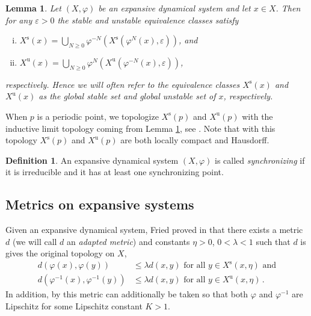 \documentclass{amsart}
\theoremstyle{plain}
\newtheorem{lemma}[theorem]{Lemma}
\theoremstyle{definition}
\newtheorem{definition}[theorem]{Definition}
\theoremstyle{remark}
\begin{document}
\begin{lemma}\label{lem:stable-unstable-inductive-limit-top}
Let $(X,\varphi)$ be an expansive dynamical system and let $x \in X$.  Then for any $\varepsilon > 0$ the stable and unstable equivalence classes satisfy
\begin{enumerate}[(i)]
    \item $\displaystyle X^\text{s}(x) = \bigcup_{N \geq 0} \varphi^{-N}\left(X^\text{s}\left(\varphi^{N}(x), \varepsilon\right)\right)$, and
    \item $\displaystyle X^\text{u}(x) = \bigcup_{N \geq 0} \varphi^{N}\left(X^\text{u}\left(\varphi^{-N}(x), \varepsilon\right)\right)$,
\end{enumerate}
respectively.  Hence we will often refer to the equivalence classes $X^\text{s}(x)$ and $X^\text{u}(x)$ as the \emph{global stable set} and \emph{global unstable set} of $x$, respectively.
\end{lemma}

When $p$ is a periodic point, we topologize $X^\text{s}(p)$ and $X^\text{u}(p)$ with the inductive limit topology coming from Lemma \ref{lem:stable-unstable-inductive-limit-top}, see \cite[Section 4.1]{thomsen2010c}.  Note that with this topology $X^\text{s}(p)$ and $X^\text{u}(p)$ are both locally compact and Hausdorff.

\begin{definition}\label{def:synchronizing-general}
An expansive dynamical system $(X,\varphi)$ is called \emph{synchronizing} if it is irreducible and it has at least one synchronizing point.
\end{definition}


\subsection{Metrics on expansive systems} \label{sec:MetExpSys}
Given an expansive dynamical system, Fried proved in \cite[Lemma 2]{fried1987} that there exists a metric $d$ (we will call $d$ an \emph{adapted metric}) and constants $\eta > 0$, $0 < \lambda < 1$ such that $d$ is gives the original topology on $X$,
\begin{align*}
    d(\varphi(x), \varphi(y)) &\leq \lambda d(x, y) \text{ for all } y \in X^\text{s}(x, \eta) \text{ and} \\
    d(\varphi^{-1}(x), \varphi^{-1}(y)) &\leq \lambda d(x, y) \text{ for all } y \in X^\text{u}(x, \eta) \,.
\end{align*}
In addition, by \cite{sakai01} this metric can additionally be taken so that both $\varphi$ and $\varphi^{-1}$ are Lipschitz for some Lipschitz constant $K > 1$.  
\end{document}
